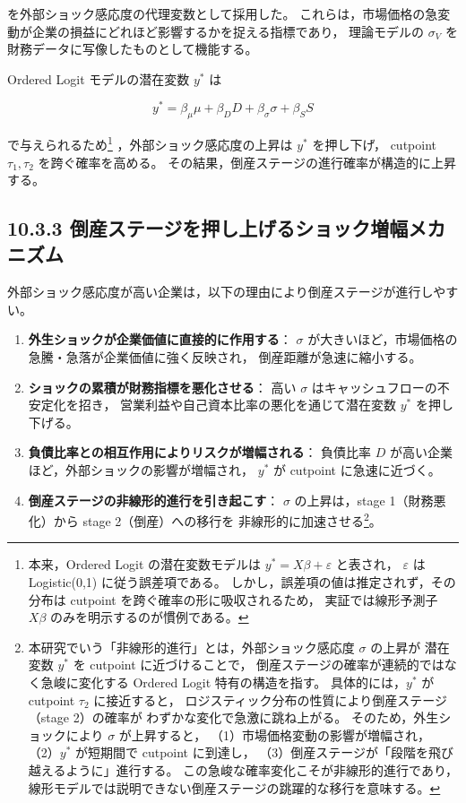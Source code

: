 を外部ショック感応度の代理変数として採用した。
これらは，市場価格の急変動が企業の損益にどれほど影響するかを捉える指標であり，
理論モデルの $\sigma_V$ を財務データに写像したものとして機能する。

Ordered Logit モデルの潜在変数 $y^*$ は



\[
y^* = \beta_\mu \mu + \beta_D D + \beta_\sigma \sigma + \beta_S S
\]



で与えられるため\footnote{
本来，Ordered Logit の潜在変数モデルは
$y^* = X\beta + \varepsilon$ と表され，
$\varepsilon$ は Logistic(0,1) に従う誤差項である。
しかし，誤差項の値は推定されず，その分布は
cutpoint を跨ぐ確率の形に吸収されるため，
実証では線形予測子 $X\beta$ のみを明示するのが慣例である。
}
，外部ショック感応度の上昇は $y^*$ を押し下げ，
cutpoint $\tau_1, \tau_2$ を跨ぐ確率を高める。
その結果，倒産ステージの進行確率が構造的に上昇する。

\subsection*{10.3.3 倒産ステージを押し上げるショック増幅メカニズム}

外部ショック感応度が高い企業は，以下の理由により倒産ステージが進行しやすい。

\begin{enumerate}
    \item \textbf{外生ショックが企業価値に直接的に作用する}：  
          $\sigma$ が大きいほど，市場価格の急騰・急落が企業価値に強く反映され，
          倒産距離が急速に縮小する。

    \item \textbf{ショックの累積が財務指標を悪化させる}：  
          高い $\sigma$ はキャッシュフローの不安定化を招き，
          営業利益や自己資本比率の悪化を通じて潜在変数 $y^*$ を押し下げる。

    \item \textbf{負債比率との相互作用によりリスクが増幅される}：  
          負債比率 $D$ が高い企業ほど，外部ショックの影響が増幅され，
          $y^*$ が cutpoint に急速に近づく。

    \item \textbf{倒産ステージの非線形的進行を引き起こす}：  
          $\sigma$ の上昇は，stage 1（財務悪化）から stage 2（倒産）への移行を
          非線形的に加速させる\footnote{
      本研究でいう「非線形的進行」とは，外部ショック感応度 $\sigma$ の上昇が
      潜在変数 $y^*$ を cutpoint に近づけることで，
      倒産ステージの確率が連続的ではなく急峻に変化する Ordered Logit 特有の構造を指す。
      具体的には，$y^*$ が cutpoint $\tau_2$ に接近すると，
      ロジスティック分布の性質により倒産ステージ（stage 2）の確率が
      わずかな変化で急激に跳ね上がる。
      そのため，外生ショックにより $\sigma$ が上昇すると，
      （1）市場価格変動の影響が増幅され，
      （2）$y^*$ が短期間で cutpoint に到達し，
      （3）倒産ステージが「段階を飛び越えるように」進行する。
      この急峻な確率変化こそが非線形的進行であり，
      線形モデルでは説明できない倒産ステージの跳躍的な移行を意味する。}。
\end{enumerate}

